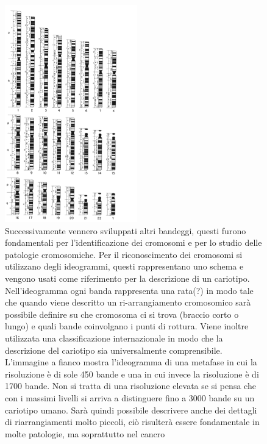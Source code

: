 \documentclass[11pt]{book}
\begin{document}
\begin{figure}[h!]
\centering
\includegraphics[scale=1.0]{img/09_cariotipo.png}
\caption{Successivamente vennero sviluppati altri bandeggi, questi furono fondamentali per l’identificazione dei cromosomi e per lo studio delle patologie cromosomiche. 
Per il riconoscimento dei cromosomi si utilizzano degli ideogrammi, questi rappresentano uno schema e vengono usati come riferimento per la descrizione di un cariotipo. Nell’ideogramma ogni banda rappresenta una rata(?) in modo tale che quando viene descritto un ri-arrangiamento cromosomico sarà possibile definire su che cromosoma ci si trova (braccio corto o lungo) e quali bande coinvolgano i punti di rottura.
Viene inoltre utilizzata una classificazione internazionale in modo che la descrizione del cariotipo sia universalmente comprensibile.
L’immagine a fianco mostra l’ideogramma di una metafase in cui la risoluzione è di sole 450 bande e una in cui invece la risoluzione è di 1700 bande. Non si tratta di una risoluzione elevata se si pensa che con i massimi livelli si arriva a distinguere fino a 3000 bande su un cariotipo umano. Sarà quindi possibile descrivere anche dei dettagli di riarrangiamenti molto piccoli, ciò risulterà essere fondamentale in molte patologie, ma soprattutto nel cancro}
\label{}
\end{figure}
\end{document}
